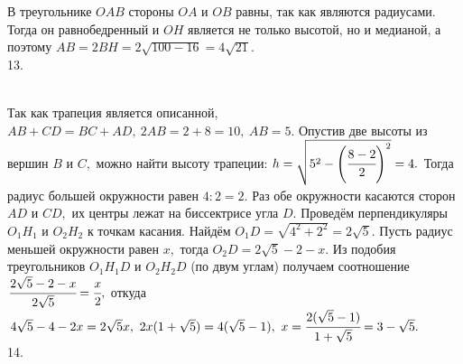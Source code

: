 \documentclass[12pt]{article}
\begin{document}
В треугольнике $OAB$ стороны $OA$ и $OB$ равны, так как являются радиусами. Тогда он равнобедренный и $OH$ является не только высотой, но и медианой, а поэтому $AB=2BH=2\sqrt{100-16}=4\sqrt{21}.$\\
13. \begin{figure}[ht!]
\end{figure}\\
Так как трапеция является описанной, $AB+CD=BC+AD,\ 2AB=2+8=10,\ AB=5.$ Опустив две высоты из вершин $B$ и $C,$ можно найти высоту трапеции: $h=\sqrt{5^2-\left(\cfrac{8-2}{2}\right)^2}=4.$ Тогда радиус большей окружности равен $4:2=2.$ Раз обе окружности касаются сторон $AD$ и $CD,$ их центры лежат на биссектрисе угла $D.$ Проведём перпендикуляры $O_1H_1$ и $O_2H_2$ к точкам касания. Найдём $O_1D=\sqrt{4^2+2^2}=2\sqrt{5}.$ Пусть радиус меньшей окружности равен $x,$ тогда  $O_2D=2\sqrt{5}-2-x.$ Из подобия треугольников $O_1H_1D$ и $O_2H_2D$ (по двум углам) получаем соотношение $\cfrac{2\sqrt{5}-2-x }{2\sqrt{5}}=\cfrac{x}{2},$ откуда $4\sqrt{5}-4-2x=2\sqrt{5}x,\ 2x(1+\sqrt{5})=4(\sqrt{5}-1),\ x=\cfrac{2(\sqrt{5}-1)}{1+\sqrt{5}}=3-\sqrt{5}.$\\
14. \begin{figure}[ht!]
\end{figure}\\
\end{document}
